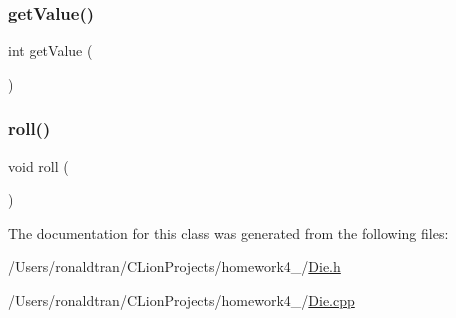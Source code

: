 \mbox{\label{class_die_aae714dc01fe7f5bb1a175d0d1068bb92}} 
\subsubsection{\texorpdfstring{getValue()}{getValue()}}
{\footnotesize\ttfamily int get\+Value (\begin{DoxyParamCaption}{ }\end{DoxyParamCaption})}

\mbox{\label{class_die_a163b2d39ba34f54f049548b12fb68c73}} 
\subsubsection{\texorpdfstring{roll()}{roll()}}
{\footnotesize\ttfamily void roll (\begin{DoxyParamCaption}{ }\end{DoxyParamCaption})}



The documentation for this class was generated from the following files\+:\begin{DoxyCompactItemize}
\item 
/\+Users/ronaldtran/\+C\+Lion\+Projects/homework4\+\_/\mbox{\hyperlink{_die_8h}{Die.\+h}}\item 
/\+Users/ronaldtran/\+C\+Lion\+Projects/homework4\+\_/\mbox{\hyperlink{_die_8cpp}{Die.\+cpp}}\end{DoxyCompactItemize}
